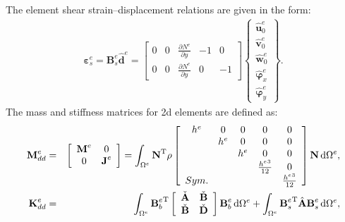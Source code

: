 The element shear strain--displacement relations are given in the form:
\begin{eqnarray}
	\boldsymbol{\varepsilon}_s^e =
	\textbf{B}_s^e\widehat{\textbf{d}}^e = 
	\left [
	\begin{array}{ccccc}
		0 & 0 & \frac{\partial N^e}{\partial y} & -1 & 0\\
		0 & 0 & \frac{\partial N^e}{\partial y} & 0 & -1
	\end{array} \right]
	\left \{ \begin{array}{c}
		\widehat{\textbf{u}}_0^e \\
		\widehat{\textbf{v}}_0^e \\
		\widehat{\textbf{w}}_0^e \\
		\widehat{\boldsymbol{\varphi}}_x^e \\
		\widehat{\boldsymbol{\varphi}}_y^e
	\end{array} \right\}.
\end{eqnarray}
%
The mass and stiffness matrices for \ac{2d} elements are defined as:
\begin{eqnarray}
	\textbf{M}_{dd}^e & = &
	\left [
	\begin{array}{cc}
		\textbf{M}^e & 0\\
		0 & \textbf{J}^e
	\end{array}
	\right] =
	\int_{\Omega^e}\textbf{N}^{\mathrm{T}}\rho
	\left [
	\begin{array}{ccccc}
		h^e & 0 & 0 & 0 & 0 \\
		& h^e & 0 & 0 & 0 \\
		&  & h^e & 0 & 0\\
		&  &  & \frac{{h^e}^3}{12} & 0\\
		Sym. &  &  &  & \frac{{h^e}^3}{12}
	\end{array} \right]
	\textbf{N} \mathop{}\!\mathrm{d}\Omega^e,\\
	\textbf{K}_{dd}^e & = & \int_{\Omega^e}{\textbf{B}_b^e}^{\mathrm{T}}
	\left[
	\begin{array}{cc}
		\check{\textbf{A}} & \check{\textbf{B}}\\
		\check{\textbf{B}} & \check{\textbf{D}}
	\end{array} \right]
	\textbf{B}_b^e \mathop{}\!\mathrm{d} \Omega^e+\int_{\Omega^e}{\textbf{B}_s^e}^{\mathrm{T}}\hat{\textbf{A}}\textbf{B}_s^e\mathop{}\!\mathrm{d} \Omega^e,
\end{eqnarray}
%
%
